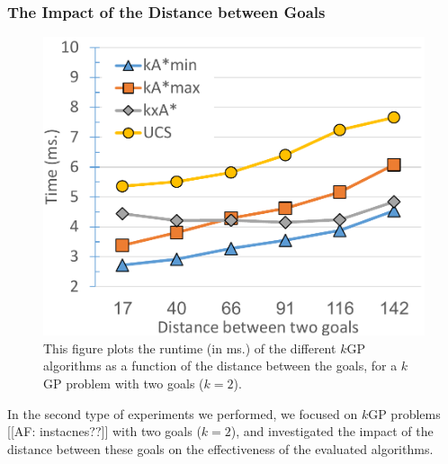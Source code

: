 \documentclass[twoside,11pt]{article}
\newcommand{\kgs}{$k$GP\xspace}
\newcommand{\roni}[1]{\textbf{[RS:#1]}}
\begin{document}
\subsubsection{The Impact of the Distance between Goals}

\begin{figure}
  \centering
  \includegraphics[width=0.5\columnwidth]{G0-G1-focused_cropped.pdf}
  \caption{This figure plots the runtime (in ms.) of the different \kgs algorithms as a function of the distance between the goals, for a \kgs problem with two goals ($k=2$).}
  \label{fig:2-goal}
\end{figure}

In the second type of experiments we performed, we focused on \kgs problems [[AF: instacnes??]] with two goals ($k=2$), and investigated the impact of the distance between these goals on the effectiveness of the evaluated algorithms.

\end{document}

